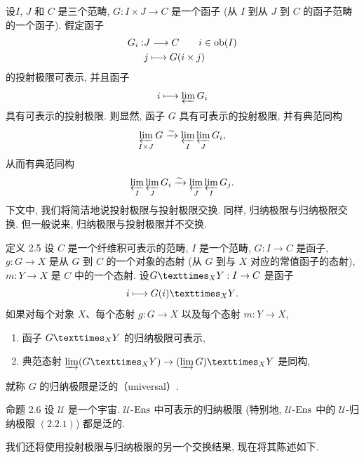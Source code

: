 \subsubsection{}
设\pageoriginale $I$, $J$ 和 $C$ 是三个范畴,
$G:I\times J\rightarrow C$ 是一个函子
(\ie 从 $I$ 到从 $J$ 到 $C$ 的函子范畴的一个函子).
假定函子
\begin{align*}
G_i:&J\longrightarrow C\qquad i\in \operatorname{ob}(I)\\
    & j\longmapsto G(i\times j)
\end{align*}
的投射极限可表示, 并且函子
$$
i\longmapsto \varprojlim G_i
$$
具有可表示的投射极限.
则显然, 函子 $G$ 具有可表示的投射极限, 并有典范同构
$$
\varprojlim_{I\times J} G\\
\xrightarrow{\sim}\varprojlim_I \varprojlim_J G_i{},
$$
从而有典范同构
$$
\varprojlim_I \varprojlim_J G_i\xrightarrow{\sim}\varprojlim_J
\varprojlim_I G_j{}.
$$
下文中, 我们将简洁地说投射极限与投射极限交换.
同样, 归纳极限与归纳极限交换.
但一般说来, 归纳极限与投射极限并不交换.

\setcounter{subsection}{5}
\begin{enonce*}{定义 2.5}
设 $C$ 是一个纤维积可表示的范畴, $I$ 是一个范畴,
$G:I\rightarrow C$ 是函子,
$g:G\rightarrow X$ 是从 $G$ 到 $C$ 的一个对象的态射
(\ie 从 $G$ 到与 $X$ 对应的常值函子的态射),
$m:Y\rightarrow X$ 是 $C$ 中的一个态射.
设\pageoriginale $\fprod{G}{Y}{X}:I\rightarrow C$ 是函子
$$
i\longmapsto \fprod{G(i)}{Y}{X} {\quoi}.
$$
如果对每个对象 $X$、每个态射 $g:G\rightarrow X$
以及每个态射 $m:Y\rightarrow X$,
\begin{enumerate}
\item[a)] 函子 $\fprod{G}{Y}{X}$ 的归纳极限可表示,

\item[b)] 典范态射 $\varinjlim (\fprod{G}{Y}{X}
  )\rightarrow \fprod{(\varinjlim G)}{Y}{X}$ 是同构,
\end{enumerate}
就称 $G$ 的归纳极限是泛的（universal）.
\end{enonce*}

\begin{enonce*}{命题 2.6}
设 $𝒰$ 是一个宇宙.
$𝒰$-$\operatorname{Ens}$ 中可表示的归纳极限
(特别地, $𝒰$-$\operatorname{Ens}$ 中的 $𝒰$-归纳极限 $\hyperref[I.sec2.2.1]{(2.2.1)}$) %
都是泛的.
\end{enonce*}
我们还将使用投射极限与归纳极限的另一个交换结果, 现在将其陈述如下.

